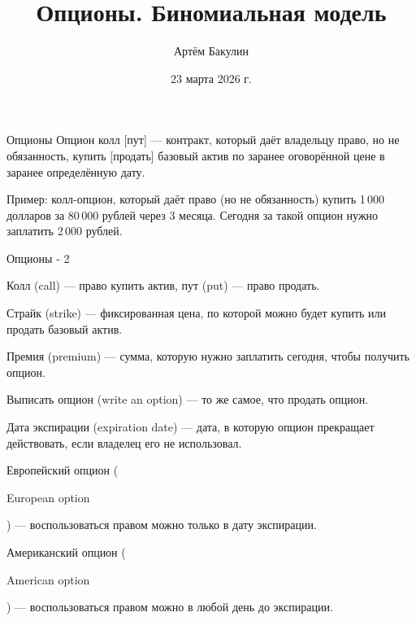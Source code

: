 \documentclass{beamer}
\title{Опционы. Биномиальная модель}
\author{Артём Бакулин}
\date{23 марта 2026 г.}
\newcommand{\en}[1]{\begin{otherlanguage}{english}#1\end{otherlanguage}}
\newcommand{\usdrubstrike}{80}
\begin{document}
\begin{frame}
\titlepage
\end{frame}



\begin{frame}{Опционы}
\justifying
\alert{Опцион колл [пут]} --- контракт, который даёт владельцу право, но не обязанность, купить [продать] базовый актив по заранее оговорённой цене в заранее определённую дату. 

\justify
Пример: колл-опцион, который даёт право (но не обязанность) купить 1\,000 долларов за \usdrubstrike\,000 рублей через 3 месяца. Сегодня за такой опцион нужно заплатить 2\,000 рублей.
\end{frame}



\begin{frame}{Опционы - 2}

\justify
 \alert{Колл} (call) --- право купить актив, \alert{пут} (put) --- право продать.

\justify
\alert{Страйк} (strike) --- фиксированная цена, по которой можно будет купить или продать базовый актив.

\justify
\alert{Премия} (premium) --- сумма, которую нужно заплатить сегодня, чтобы получить опцион.

\justify
\alert{Выписать} опцион (write an option) --- то же самое, что продать опцион.

\justify
\alert{Дата экспирации} (expiration date) --- дата, в которую опцион прекращает действовать, если владелец его не использовал.

\justify
\alert{Европейский} опцион (\en{European option}) --- воспользоваться правом можно только в дату экспирации.

\justify
\alert{Американский} опцион (\en{American option}) --- воспользоваться правом можно в любой день до экспирации.
\end{frame}



\newcommand{\circlewithtext}[3]{
    \node[circle, fill, inner sep = 1.5pt] at (#1, #2) {};
    \node[anchor = north] at (#1, #2) {#3};
}
\end{document}
